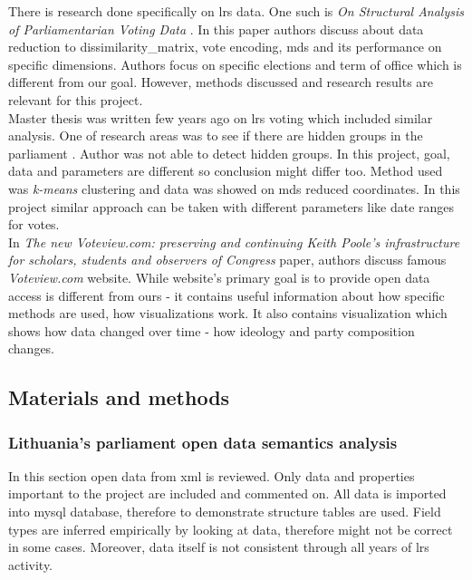 \documentclass[a4paper,12pt]{article}
\begin{document}
	
	There is research done specifically on \gls{lrs} data. One such is \textit{On Structural Analysis of Parliamentarian Voting Data} \cite{DBLP:journals/informaticaLT/KrilaviciusZ08}. In this paper authors discuss about data reduction to \gls{dissimilarity_matrix}, vote encoding, \gls{mds} and its performance on specific dimensions. Authors focus on specific elections and term of office which is different from our goal. However, methods discussed and research results are relevant for this project.\\
	
	Master thesis was written few years ago on \gls{lrs} voting which included similar analysis. One of research areas was to see if there are hidden groups in the parliament \cite{vytautas_mick_magistrinis}. Author was not able to detect hidden groups. In this project, goal, data and parameters are different so conclusion might differ too. Method used was \textit{k-means} clustering and data was showed on \gls{mds} reduced coordinates. In this project similar approach can be taken with different parameters like date ranges for votes.  \\
	
	In \textit{The new Voteview.com: preserving and continuing Keith Poole’s infrastructure for scholars, students and observers of Congress} \cite{article} paper, authors discuss famous \textit{Voteview.com} website. While website's primary goal is to provide open data access is different from ours - it contains useful information about how specific methods are used, how visualizations work. It also contains visualization which shows how data changed over time - how ideology and party composition changes.
	
		
	
	
	\clearpage
	
	\subsection{Materials and methods}
   	
 	\subsubsection{Lithuania's parliament open data semantics analysis }
 	
 	In this section open data from \acrshort{xml} is reviewed. Only data and properties important to the project are included and commented on. All data is imported into \gls{mysql} database, therefore to demonstrate structure tables are used. Field types are inferred empirically by looking at data, therefore might not be correct in some cases. Moreover, data itself is not consistent through all years of \acrlong{lrs} activity.\\
	
\end{document}
